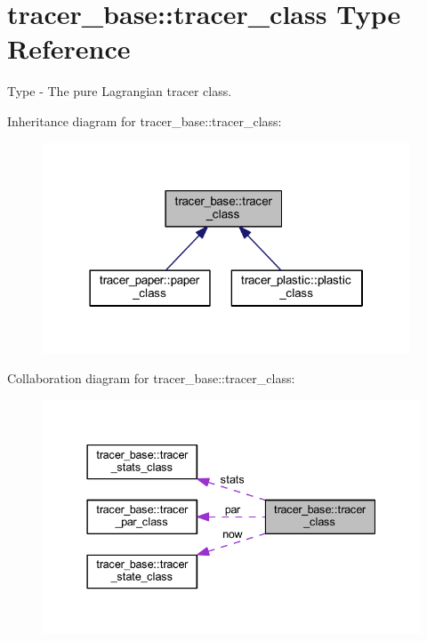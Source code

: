 \hypertarget{structtracer__base_1_1tracer__class}{}\section{tracer\+\_\+base\+:\+:tracer\+\_\+class Type Reference}
\label{structtracer__base_1_1tracer__class}


Type -\/ The pure Lagrangian tracer class.  




Inheritance diagram for tracer\+\_\+base\+:\+:tracer\+\_\+class\+:\nopagebreak
\begin{figure}[H]
\begin{center}
\leavevmode
\includegraphics[width=310pt]{structtracer__base_1_1tracer__class__inherit__graph}
\end{center}
\end{figure}


Collaboration diagram for tracer\+\_\+base\+:\+:tracer\+\_\+class\+:\nopagebreak
\begin{figure}[H]
\begin{center}
\leavevmode
\includegraphics[width=337pt]{structtracer__base_1_1tracer__class__coll__graph}
\end{center}
\end{figure}

